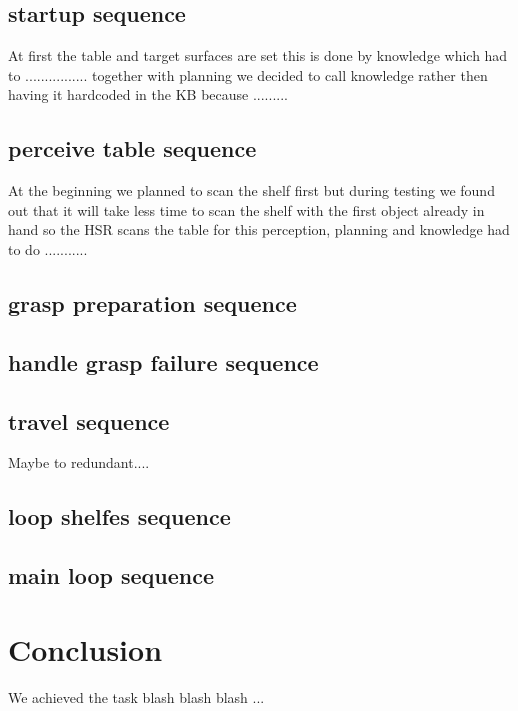 \documentclass[main.tex]{subfiles}
\begin{document}
	\subsection{startup sequence}
	At first the table and target surfaces are set this is done by knowledge which had to ................ together with planning we decided to call knowledge rather then having it hardcoded in the KB because .........

	\subsection{perceive table sequence}
	At the beginning we planned to scan the shelf first but during testing we found out that it will take less time to scan the shelf with the first object already in hand so the HSR scans the table for this perception, planning and knowledge had to do ...........

	\subsection{grasp preparation sequence}
	\subsection{handle grasp failure sequence}
	\subsection{travel sequence}
	Maybe to redundant....
	\subsection{loop shelfes sequence}
	\subsection{main loop sequence}
	
	\section{Conclusion}

	We achieved the task blash blash blash ...
	
	
	\endgroup
	
\end{document}
